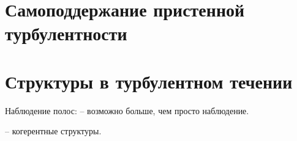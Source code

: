 \section{Самоподдержание пристенной турбулентности}
\cite{waleffe1997self, hamilton1995regeneration, waleffe1995hydrodynamic, waleffe1997self, schoppa2002coherent}

\cite{}


\section{Структуры в турбулентном течении}

Наблюдение полос: \cite{smith1983characteristics, schoppa2002coherent, kline1967structure}
\cite{schoppa2002coherent} -- возможно больше, чем просто наблюдение. 
\cite{klebanoff1962three}

\cite{jeong1997coherent, schoppa2002coherent} -- когерентные структуры. 



